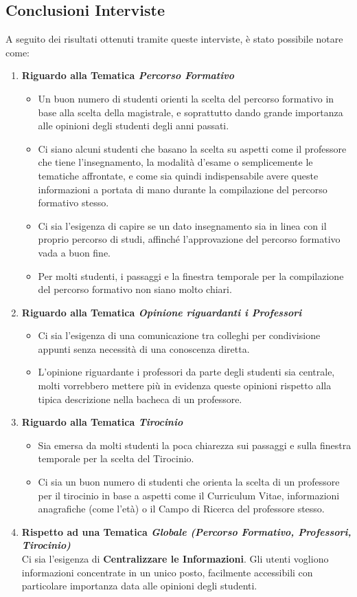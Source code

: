 \subsection{Conclusioni Interviste}
A seguito dei risultati ottenuti tramite queste interviste, è stato possibile notare come:
\begin{enumerate}
    \item \textbf{Riguardo alla Tematica \textit{Percorso Formativo}}
    \begin{itemize}
        \item Un buon numero di studenti orienti la scelta del percorso formativo in base 
        alla scelta della magistrale, e soprattutto dando grande importanza alle opinioni degli studenti degli anni passati.
        \item Ci siano alcuni studenti che basano la scelta su aspetti come il professore che tiene l'insegnamento, la modalità d'esame o semplicemente le tematiche affrontate,
        e come sia quindi indispensabile avere queste informazioni a portata di mano durante la compilazione del percorso formativo stesso.
        \item Ci sia l'esigenza di capire se un dato insegnamento sia in linea con il proprio percorso di studi, affinché l'approvazione del percorso formativo vada a buon fine.
        \item Per molti studenti, i passaggi e la finestra temporale per la compilazione del percorso formativo non siano molto chiari.
    \end{itemize}
    \item \textbf{Riguardo alla Tematica \textit{Opinione riguardanti i Professori}}
    \begin{itemize}
        \item Ci sia l'esigenza di una comunicazione tra colleghi per condivisione appunti senza necessità di una conoscenza diretta.
        \item L'opinione riguardante i professori da parte degli studenti sia centrale, molti vorrebbero mettere più
        in evidenza queste opinioni rispetto alla tipica descrizione nella bacheca di un professore.
    \end{itemize}
    \item \textbf{Riguardo alla Tematica \textit{Tirocinio}}
    \begin{itemize}
        \item Sia emersa da molti studenti la poca chiarezza sui passaggi e sulla finestra temporale per la scelta del Tirocinio.
        \item Ci sia un buon numero di studenti che orienta la scelta di un professore per il tirocinio in base a aspetti come il Curriculum Vitae, informazioni anagrafiche (come l'età) o il Campo di Ricerca del professore stesso.
    \end{itemize}  
    \item \textbf{Rispetto ad una Tematica \textit{Globale (Percorso Formativo, Professori, Tirocinio)}}\\
    Ci sia l'esigenza di \textbf{Centralizzare le Informazioni}.
    Gli utenti vogliono informazioni concentrate in un unico posto, facilmente accessibili con particolare importanza data alle opinioni degli studenti.
    

\end{enumerate}

